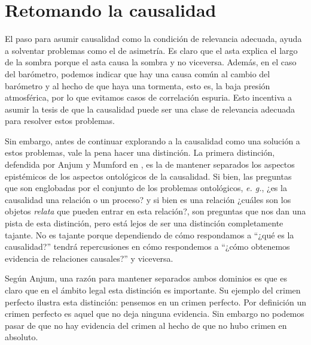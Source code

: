 \section{Retomando la causalidad}

\noindent El paso para asumir causalidad como la condición de relevancia adecuada, ayuda a solventar problemas como el de asimetría. Es claro que el asta explica el largo de la sombra porque el asta causa la sombra y no viceversa. Además, en el caso del barómetro, podemos indicar que hay una causa común al cambio del barómetro y al hecho de que haya una tormenta, esto es, la baja presión atmosférica, por lo que evitamos casos de correlación espuria. Esto incentiva a asumir la tesis de que la causalidad puede ser una clase de relevancia adecuada para resolver estos problemas.

Sin embargo, antes de continuar explorando a la causalidad como una solución a estos problemas, vale la pena hacer una distinción. La primera distinción, defendida por Anjum y Mumford en \citeyear{Anjum2018}, es la de mantener separados los aspectos epistémicos de los aspectos ontológicos de la causalidad. Si bien, las preguntas que son englobadas por el conjunto de los problemas ontológicos, \textit{e. g.}, ¿es la causalidad una relación o un proceso? y si bien es una relación ¿cuáles son los objetos \textit{relata} que pueden entrar en esta relación?, son preguntas que nos dan una pista de esta distinción, pero está lejos de ser una distinción completamente tajante. No es tajante porque dependiendo de cómo respondamos a ``¿qué es la causalidad?'' tendrá repercusiones en cómo respondemos a ``¿cómo obtenemos evidencia de relaciones causales?'' y viceversa.

Según Anjum, una razón para mantener separados ambos dominios es que es claro que en el ámbito legal esta distinción es importante. Su ejemplo del crimen perfecto ilustra esta distinción: pensemos en un crimen perfecto. Por definición un crimen perfecto es aquel que no deja ninguna evidencia. Sin embargo no podemos pasar de que no hay evidencia del crimen al hecho de que no hubo crimen en absoluto.


